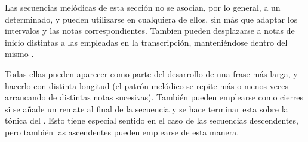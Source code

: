 Las secuencias melódicas de esta sección no se asocian, por lo general, a un \maqam determinado, y pueden utilizarse en cualquiera de ellos, sin más que adaptar los intervalos y las notas correspondientes. Tambien pueden desplazarse a notas de inicio distintas a las empleadas en la transcripción, manteniéndose dentro del mismo \maqam.

Todas ellas pueden aparecer como parte del desarrollo de una frase más larga, y hacerlo con distinta longitud (el patrón melódico se repite más o menos veces arrancando de distintas notas sucesivas). También pueden emplearse como cierres si se añade un remate al final de la secuencia y se hace terminar esta sobre la tónica del \maqamb. Esto tiene especial sentido en el caso de las secuencias descendentes, pero también las ascendentes pueden emplearse de esta manera.


\newsequence{}

\begin{center}
\end{center}


\newsequence{}

\begin{center}
\end{center}



\newsequence{}

\begin{center}
\end{center}


